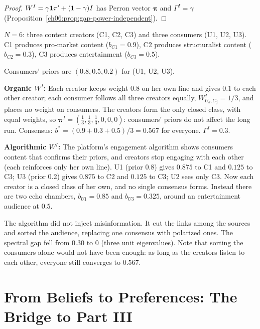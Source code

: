 \documentclass[../structural_economics_book.tex]{subfiles}
\begin{document}
\begin{proof}
$W^I = \gamma\mathbf{1}\pi' + (1-\gamma)I$ has Perron vector $\boldsymbol{\pi}$ and $\Gamma^I = \gamma$ (Proposition~\ref{ch06:prop:gap-power-independent}).
\end{proof}

\begin{example}\label{ch08:ex:platform}
$N = 6$: three content creators (C1, C2, C3) and three consumers (U1, U2, U3). C1 produces pro-market content ($b_{C1} = 0.9$), C2 produces structuralist content ($b_{C2} = 0.3$), C3 produces entertainment ($b_{C3} = 0.5$).

Consumers' priors are $(0.8, 0.5, 0.2)$ for (U1, U2, U3). \textup{\illustrative}

\textbf{Organic $W^I$:} Each creator keeps weight $0.8$ on her own line and gives $0.1$ to each other creator; each consumer follows all three creators equally, $W^I_{U_k, C_j} = 1/3$, and places no weight on consumers. The creators form the only closed class, with equal weights, so $\boldsymbol{\pi}^I = (\frac13, \frac13, \frac13, 0, 0, 0)$: consumers' priors do not affect the long run. Consensus: $b^* = (0.9 + 0.3 + 0.5)/3 = 0.567$ for everyone. $\Gamma^I = 0.3$.

\textbf{Algorithmic $W^I$:} The platform's engagement algorithm shows consumers content that confirms their priors, and creators stop engaging with each other (each reinforces only her own line). U1 (prior 0.8) gives $0.875$ to C1 and $0.125$ to C3; U3 (prior 0.2) gives $0.875$ to C2 and $0.125$ to C3; U2 sees only C3. Now each creator is a closed class of her own, and no single consensus forms. Instead there are two echo chambers, $b_{U1} = 0.85$ and $b_{U3} = 0.325$, around an entertainment audience at $0.5$.

The algorithm did not inject misinformation. It cut the links among the sources and sorted the audience, replacing one consensus with polarized ones. The spectral gap fell from $0.30$ to $0$ (three unit eigenvalues). Note that sorting the consumers alone would not have been enough: as long as the creators listen to each other, everyone still converges to $0.567$.
\end{example}


\section{From Beliefs to Preferences: The Bridge to Part III}
\label{ch08:sec:bridge}
\end{document}
